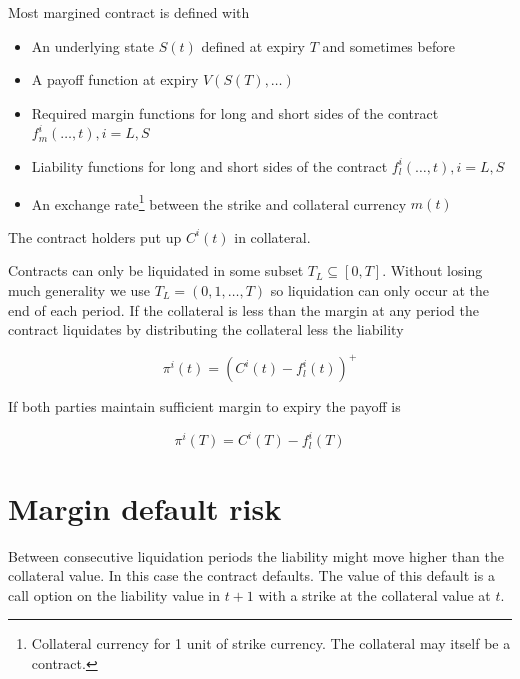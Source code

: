 \documentclass[12pt]{article}
\begin{document}
Most  margined contract is defined with 

\begin{itemize}
    \item An underlying state $S(t)$ defined at expiry $T$ and sometimes before
    \item A payoff function at expiry $V(S(T),\ldots)$
    \item Required margin functions for long and short sides of the contract
    $f_m^{i}(\ldots,t),  i = L,S$
    \item Liability functions for long and short sides of the contract $f_l^{i}(\ldots,t),  i = L,S$
    \item An exchange rate\footnote{Collateral currency for 1 unit of strike currency. The collateral may itself be a contract.} between the strike and collateral currency $m(t)$ 
\end{itemize}

The contract holders put up $C^i(t)$ in collateral. 

Contracts can only be liquidated in some subset $T_L \subseteq [0,T]$. Without losing much generality we use $T_L = (0,1,\ldots,T)$ so liquidation can only occur at the end of each period. If the collateral is less than the margin at any period the contract liquidates by distributing the collateral less the liability 

\begin{equation} \label{defaultpi}
\pi^i(t) = (C^i(t)-f_l^i(t) )^+ 
\end{equation}


If both parties maintain sufficient margin to expiry the payoff is 

\begin{equation}\label{expirypi}
\pi^i(T) = C^i(T)-f_l^i(T)
\end{equation}

 

\section{Margin default risk}

Between consecutive liquidation periods the liability might move higher than the collateral value. In this case the contract defaults. The value of this default is a call option on the liability value in $t+1$ with a strike at the collateral value at $t$. 
\end{document}
